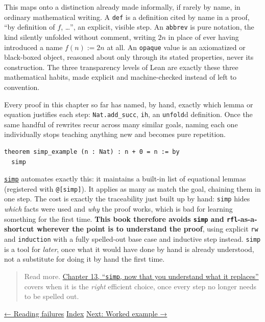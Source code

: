 \begin{mathreading}

This maps onto a distinction already made informally, if rarely by name, in ordinary mathematical writing. A \texttt{def} is a definition cited by name in a proof, ``by definition of \(f\), \ldots{}'', an explicit, visible step. An \texttt{abbrev} is pure notation, the kind silently unfolded without comment, writing \(2n\) in place of ever having introduced a name \(f(n) := 2n\) at all. An \texttt{opaque} value is an axiomatized or black-boxed object, reasoned about only through its stated properties, never its construction. The three transparency levels of Lean are exactly these three mathematical habits, made explicit and machine-checked instead of left to convention.

\end{mathreading}

Every proof in this chapter so far has named, by hand, exactly which lemma or equation justifies each step: \texttt{Nat.add\_\allowbreak{}succ}, \texttt{ih}, an \texttt{unfold}d definition. Once the same handful of rewrites recur across many similar goals, naming each one individually stops teaching anything new and becomes pure repetition.

\begin{lstlisting}
theorem simp_example (n : Nat) : n + 0 = n := by
  simp
\end{lstlisting}

\href{https://lean-lang.org/doc/reference/latest/Tactic-Proofs/Tactic-Reference/}{\texttt{simp}} automates exactly this: it maintains a built-in list of equational lemmas (registered with \texttt{@[simp]}). It applies as many as match the goal, chaining them in one step. The cost is exactly the traceability just built up by hand: \texttt{simp} hides \emph{which} facts were used and \emph{why} the proof works, which is bad for learning something for the first time. \textbf{This book therefore avoids \texttt{simp} and \texttt{rfl}-as-a-shortcut wherever the point is to understand the proof}, using explicit \texttt{rw} and \texttt{induction} with a fully spelled-out base case and inductive step instead. \texttt{simp} is a tool for \emph{later}, once what it would have done by hand is already understood, not a substitute for doing it by hand the first time.

\begin{quote}
Read more. \hyperref[sec:13-working-efficiently:03-simp:1]{Chapter 13, ``\texttt{simp}, now that you understand what it replaces''} covers when it is the \emph{right} efficient choice, once every step no longer needs to be spelled out.
\end{quote}

\hyperref[sec:05-tactics:03-reading-failures:1]{← Reading failures} \textbar{} \hyperref[sec:05-tactics:00-index:1]{Index} \textbar{} \hyperref[sec:05-tactics:05-worked-example:1]{Next: Worked example →}
